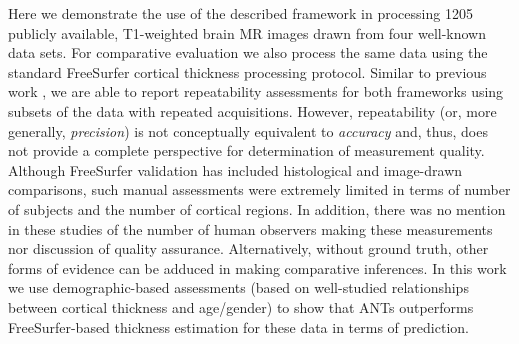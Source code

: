 Here we demonstrate the use of the described framework in processing
1205 publicly available, T1-weighted brain MR images drawn from four
well-known data sets.  For comparative evaluation we also process the
same data using the standard FreeSurfer cortical thickness processing
protocol.  Similar to previous work \citep[e.g.,][]{clarkson2011}, we
are able to report repeatability assessments for both frameworks using
subsets of the data with repeated acquisitions.
However, repeatability (or, more generally, {\it precision}) is not
conceptually equivalent to {\it accuracy} and, thus, does not provide
a complete perspective for determination of measurement quality.
Although FreeSurfer validation has included histological
\citep{rosas2002} and image-drawn \citep{kuperberg2003} comparisons,
such manual assessments were extremely limited in terms of number of
subjects and the number of cortical regions.  In addition, there was
no mention in these studies of the number of human observers making
these measurements nor discussion of quality assurance.
Alternatively, without ground truth, other forms of evidence can be
adduced \citep[e.g.,][]{bouix2007} in making comparative inferences.
In this work we use demographic-based assessments 
(based on well-studied relationships between cortical thickness
and age/gender) to show that ANTs outperforms FreeSurfer-based thickness 
estimation for these data in terms of prediction.

